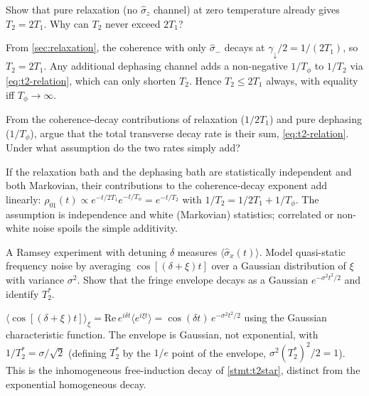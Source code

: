 \begin{exercise}
Show that pure relaxation (no $\hat\sigma_z$ channel) at
zero temperature already gives $T_2=2T_1$. Why can $T_2$ never
exceed $2T_1$?
\begin{solution}
From \cref{sec:relaxation}, the coherence with only
$\hat\sigma_-$ decays at $\gamma_\downarrow/2=1/(2T_1)$, so
$T_2=2T_1$. Any additional dephasing channel adds a non-negative
$1/T_\phi$ to $1/T_2$ via \cref{eq:t2-relation}, which can only
shorten $T_2$. Hence $T_2\leq2T_1$ always, with equality iff
$T_\phi\to\infty$.
\end{solution}
\end{exercise}

\begin{exercise}
From the coherence-decay contributions of relaxation
($1/2T_1$) and pure dephasing ($1/T_\phi$), argue that the total
transverse decay rate is their sum, \cref{eq:t2-relation}. Under
what assumption do the two rates simply add?
\begin{solution}
If the relaxation bath and the dephasing bath are statistically
independent and both Markovian, their contributions to the
coherence-decay exponent add linearly:
$\rho_{01}(t)\propto e^{-t/2T_1}e^{-t/T_\phi}=e^{-t/T_2}$ with
$1/T_2=1/2T_1+1/T_\phi$. The assumption is independence and white
(Markovian) statistics; correlated or non-white noise spoils the
simple additivity.
\end{solution}
\end{exercise}

\begin{exercise}
A Ramsey experiment with detuning $\delta$ measures
$\langle\hat\sigma_x(t)\rangle$. Model quasi-static frequency noise
by averaging $\cos[(\delta+\xi)t]$ over a Gaussian distribution of
$\xi$ with variance $\sigma^2$. Show that the fringe envelope
decays as a Gaussian $e^{-\sigma^2t^2/2}$ and identify $T_2^*$.
\begin{solution}
$\langle\cos[(\delta+\xi)t]\rangle_\xi
=\mathrm{Re}\,e^{i\delta t}\langle e^{i\xi t}\rangle
=\cos(\delta t)\,e^{-\sigma^2t^2/2}$ using the Gaussian
characteristic function. The envelope is Gaussian, not exponential,
with $1/T_2^*=\sigma/\sqrt2$ (defining $T_2^*$ by the $1/e$ point of
the envelope, $\sigma^2 (T_2^*)^2/2=1$). This is the inhomogeneous
free-induction decay of \cref{stmt:t2star}, distinct from the
exponential homogeneous decay.
\end{solution}
\end{exercise}

